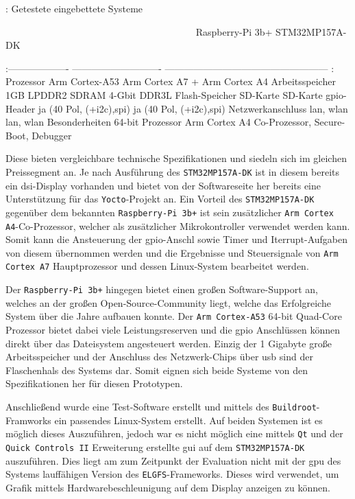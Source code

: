 : Getestete eingebettete Systeme \label{embsystems}

~~~~~~~~~~~~~~~~~~~~~~~~~~~~~~~~~~~~~~~\textbar{} Raspberry-Pi 3b+
\textbar{} STM32MP157A-DK \textbar{}

\textbar{}:------------------- \textbar{}----------------------------
\textbar{}---------------------------------------------------
:\textbar{} \textbar{} Prozessor \textbar{} Arm Cortex-A53 \textbar{}
Arm Cortex A7 + Arm Cortex A4 \textbar{} \textbar{} Arbeitsspeicher
\textbar{} 1GB LPDDR2 SDRAM \textbar{} 4-Gbit DDR3L \textbar{}
\textbar{} Flash-Speicher \textbar{} SD-Karte \textbar{} SD-Karte
\textbar{} \textbar{} \gls{gpio}-Header \textbar{} ja (40 Pol,
(+i2c),\gls{spi}) \textbar{} ja (40 Pol, (+i2c),\gls{spi}) \textbar{}
\textbar{} Netzwerkanschluss \textbar{} \gls{lan}, \gls{wlan} \textbar{}
\gls{lan}, \gls{wlan} \textbar{} \textbar{} Besonderheiten \textbar{}
64-bit Prozessor \textbar{} Arm Cortex A4 Co-Prozessor, Secure-Boot,
Debugger \textbar{}

Diese bieten vergleichbare technische Spezifikationen und siedeln sich
im gleichen Preissegment an. Je nach Ausführung des
\passthrough{\lstinline!STM32MP157A-DK!} ist in diesem bereits ein
\gls{dsi}-Display vorhanden und bietet von der Softwareseite her bereits
eine Unterstützung für das \passthrough{\lstinline!Yocto!}-Projekt an.
Ein Vorteil des \passthrough{\lstinline!STM32MP157A-DK!} gegenüber dem
bekannten \passthrough{\lstinline!Raspberry-Pi 3b+!} ist sein
zusätzlicher \passthrough{\lstinline!Arm Cortex A4!}-Co-Prozessor,
welcher als zusätzlicher Mikrokontroller verwendet werden kann. Somit
kann die Ansteuerung der \gls{gpio}-Anschl sowie Timer und
Iterrupt-Aufgaben von diesem übernommen werden und die Ergebnisse und
Steuersignale von \passthrough{\lstinline!Arm Cortex A7!} Hauptprozessor
und dessen Linux-System bearbeitet werden.

Der \passthrough{\lstinline!Raspberry-Pi 3b+!} hingegen bietet einen
großen Software-Support an, welches an der großen Open-Source-Community
liegt, welche das Erfolgreiche System über die Jahre aufbauen konnte.
Der \passthrough{\lstinline!Arm Cortex-A53!} 64-bit Quad-Core Prozessor
bietet dabei viele Leistungsreserven und die \gls{gpio} Anschlüssen
können direkt über das Dateisystem angesteuert werden. Einzig der 1
Gigabyte große Arbeitsspeicher und der Anschluss des Netzwerk-Chips über
\gls{usb} sind der Flaschenhals des Systems dar. Somit eignen sich beide
Systeme von den Spezifikationen her für diesen Prototypen.

Anschließend wurde eine Test-Software erstellt und mittels des
\passthrough{\lstinline!Buildroot!}-Framworks ein passendes Linux-System
erstellt. Auf beiden Systemen ist es möglich dieses Auszuführen, jedoch
war es nicht möglich eine mittels \passthrough{\lstinline!Qt!} und der
\passthrough{\lstinline!Quick Controls II!} Erweiterung erstellte
\gls{gui} auf dem \passthrough{\lstinline!STM32MP157A-DK!} auszuführen.
Dies liegt am zum Zeitpunkt der Evaluation nicht mit der \gls{gpu} des
Systems lauffähigen Version des
\passthrough{\lstinline!ELGFS!}-Frameworks. Dieses wird verwendet, um
Grafik mittels Hardwarebeschleunigung auf dem Display anzeigen zu
können.

